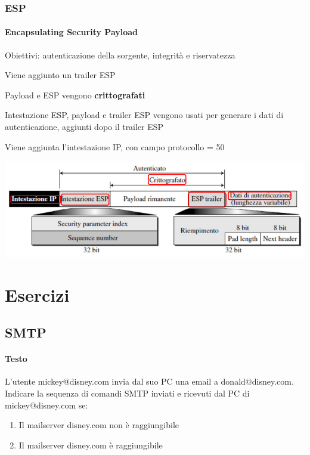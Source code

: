 \documentclass[10pt]{article}
\begin{document}
{\subsubsection{ESP}
\paragraph{Encapsulating Security Payload} Obiettivi: autenticazione della sorgente, integrità e riservatezza
\begin{list}{}{}
	\item Viene aggiunto un trailer ESP
	\item Payload e ESP vengono \textbf{crittografati}
	\item Intestazione ESP, payload e trailer ESP vengono usati per generare i dati di autenticazione, aggiunti dopo il trailer ESP
	\item Viene aggiunta l'intestazione IP, con campo protocollo = 50
\end{list}
\begin{center}
\includegraphics[scale=0.7]{ipsecesp.png}
\end{center}
\pagebreak
\section{Esercizi}
\subsection{SMTP}
\paragraph{Testo} L’utente mickey@disney.com invia dal suo PC una email a donald@disney.com.\\
Indicare la sequenza di comandi SMTP inviati e ricevuti dal PC di mickey@disney.com se:
\begin{enumerate}
\item Il mailserver disney.com non è raggiungibile
\item Il mailserver disney.com è raggiungibile
\end{enumerate}
}
\end{document}
